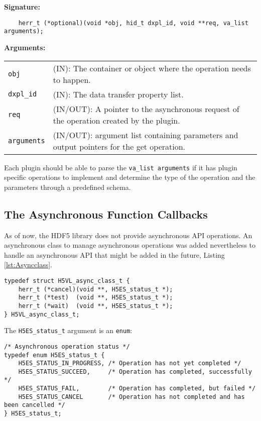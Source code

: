 \begin{mdframed}[style=bgbox]
\textbf{Signature:}
\begin{lstlisting}
    herr_t (*optional)(void *obj, hid_t dxpl_id, void **req, va_list arguments);
\end{lstlisting}

\textbf{Arguments:}\\
\begin{tabular}{l p{13.5cm}}
  \texttt{obj} & (IN): The container or object where the operation needs to happen.\\
  \texttt{dxpl\_id} & (IN): The data transfer property list.\\
  \texttt{req} & (IN/OUT): A pointer to the asynchronous request of the operation created by the plugin.\\
  \texttt{arguments} & (IN/OUT): argument list containing parameters and output pointers for the get operation. \\
\end{tabular}
\end{mdframed}

Each plugin should be able to parse the \texttt{va\_list arguments} if it has plugin specific operations to implement and determine the type of the operation and the parameters through a predefined schema. 

\subsection{The Asynchronous Function Callbacks}
As of now, the HDF5 library does not provide asynchronous API
operations. An asynchronous class to manage asynchronous operations
was added nevertheless to handle an asynchronous API that might be
added in the future, Listing \ref{lst:Asyncclass}.

\begin{lstlisting}[caption={Structure for async callback routines, H5VLpublic.h}, captionpos=b, label={lst:Asyncclass}]
typedef struct H5VL_async_class_t {
    herr_t (*cancel)(void **, H5ES_status_t *);
    herr_t (*test)  (void **, H5ES_status_t *);
    herr_t (*wait)  (void **, H5ES_status_t *);
} H5VL_async_class_t;
\end{lstlisting}

The \texttt{H5ES\_status\_t} argument is an \texttt{enum}:
\begin{lstlisting}
/* Asynchronous operation status */
typedef enum H5ES_status_t {
    H5ES_STATUS_IN_PROGRESS, /* Operation has not yet completed */
    H5ES_STATUS_SUCCEED,     /* Operation has completed, successfully */
    H5ES_STATUS_FAIL,        /* Operation has completed, but failed */
    H5ES_STATUS_CANCEL       /* Operation has not completed and has been cancelled */
} H5ES_status_t;
\end{lstlisting}

